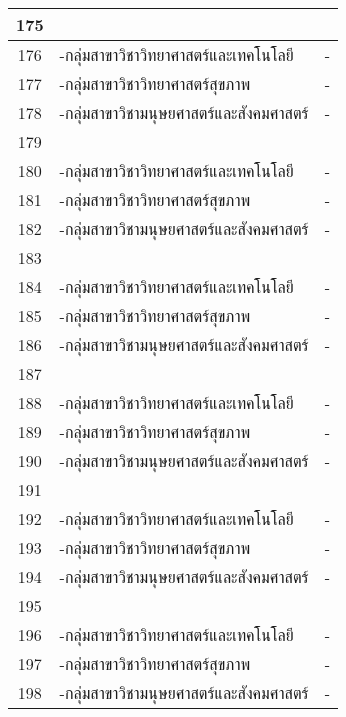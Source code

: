 \begin{longtable}{|c|p{}|c|}
	175&\cellcolor{red!10}{ผลงานวิจัยที่หน่วยงานหรือองค์กรระดับชาติว่าจ้างให้ดำเนินการ}&\cellcolor{red!10}{}\\\hline
	176&-กลุ่มสาขาวิชาวิทยาศาสตร์และเทคโนโลยี&-\\\hline
	177&-กลุ่มสาขาวิชาวิทยาศาสตร์สุขภาพ&-\\\hline
	178&-กลุ่มสาขาวิชามนุษยศาสตร์และสังคมศาสตร์&-\\\hline
	
	179&\cellcolor{red!10}{ผลงานค้นพบพันธุ์พืช พันธุ์สัตว์ ที่ค้นพบใหม่และได้รับการจดทะเบียน}&\cellcolor{red!10}{\textbf{-}}\\\hline
	180&-กลุ่มสาขาวิชาวิทยาศาสตร์และเทคโนโลยี&-\\\hline
	181&-กลุ่มสาขาวิชาวิทยาศาสตร์สุขภาพ&-\\\hline
	182&-กลุ่มสาขาวิชามนุษยศาสตร์และสังคมศาสตร์&-\\\hline
	
	183&\cellcolor{red!10}{ตำราหรือหนังสือหรืองานแปลที่ได้รับการประเมินผ่านเกณฑ์การขอตำแหน่งทางวิชาการแล้ว}&\cellcolor{red!10}{\textbf{-}}\\\hline
	184&-กลุ่มสาขาวิชาวิทยาศาสตร์และเทคโนโลยี&-\\\hline
	185&-กลุ่มสาขาวิชาวิทยาศาสตร์สุขภาพ&-\\\hline
	186&-กลุ่มสาขาวิชามนุษยศาสตร์และสังคมศาสตร์&-\\\hline
	
	187&\cellcolor{red!10}{ตำราหรือหนังสือหรืองานแปลที่ผ่านการพิจารณาตามหลักเกณฑ์การประเมินตำแหน่งทางวิชาการแต่ไม่ได้นำมาขอรับการประเมินตำแหน่งทางวิชาการ}&\cellcolor{red!10}{\textbf{-}}\\\hline
	188&-กลุ่มสาขาวิชาวิทยาศาสตร์และเทคโนโลยี&-\\\hline
	189&-กลุ่มสาขาวิชาวิทยาศาสตร์สุขภาพ&-\\\hline
	190&-กลุ่มสาขาวิชามนุษยศาสตร์และสังคมศาสตร์&-\\\hline
	
	191&\cellcolor{red!10}{งานสร้างสรรค์ที่มีการเผยแพร่สู่สาธารณะในลักษณะใดลักษณะหนึ่ง หรือผ่านสื่ออิเล็กทรอนิกส์ online}&\cellcolor{red!10}{\textbf{-}}\\\hline
	192&-กลุ่มสาขาวิชาวิทยาศาสตร์และเทคโนโลยี&-\\\hline
	193&-กลุ่มสาขาวิชาวิทยาศาสตร์สุขภาพ&-\\\hline
	194&-กลุ่มสาขาวิชามนุษยศาสตร์และสังคมศาสตร์&-\\\hline
	
	195&\cellcolor{red!10}{งานสร้างสรรค์ที่ได้รับการเผยแพร่ในระดับสถาบัน}&\cellcolor{red!10}{\textbf{-}}\\\hline
	196&-กลุ่มสาขาวิชาวิทยาศาสตร์และเทคโนโลยี&-\\\hline
	197&-กลุ่มสาขาวิชาวิทยาศาสตร์สุขภาพ&-\\\hline
	198&-กลุ่มสาขาวิชามนุษยศาสตร์และสังคมศาสตร์&-\\\hline
	

\end{longtable}
